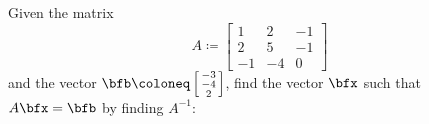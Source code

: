 \begin{problem}
  Given the matrix
  \begin{equation}
    \label{eq:2:2}
    A\coloneq
    \begin{bmatrix}
      1&2&-1\\
      2&5&-1\\
      -1&-4&0
    \end{bmatrix}
  \end{equation}
  and the vector
  $\bfb\coloneq\left[\begin{smallmatrix}-3\\-4\\2\end{smallmatrix}\right]$,
  find the vector $\bfx$ such that $A\bfx=\bfb$ by finding $A^{-1}$:

\end{problem}
